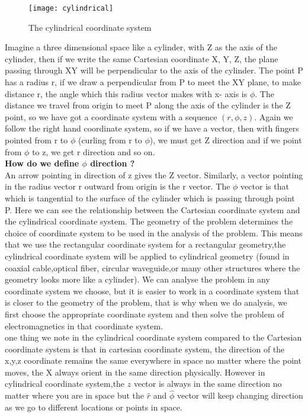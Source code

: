 	\begin{figure}[h]
		\centering
		\texttt{[image: cylindrical]}
		\caption{The cylindrical coordinate system}
	\end{figure} 
     Imagine a three dimensional space like a cylinder, with Z as the axis of the cylinder, then if we write the same Cartesian coordinate X, Y, Z, the plane passing through XY will be perpendicular to the axis of the cylinder. The point P has a radius r, if we draw a perpendicular from P to meet the XY plane, to make distance r, the angle which this radius vector makes with x- axis is $\phi$. The distance we travel from origin to meet P along the axis of the cylinder is the Z point, so we have got a coordinate system with a sequence $( r, \phi, z)$. Again we follow the right hand coordinate system, so if we have a vector, then with fingers pointed from r to $\phi $ (curling from r to $\phi$), we must get Z direction and if we point from $\phi$ to z, we get r direction and so on.\\
	 \textbf{ How do we define $\phi$ direction ?}\\ An arrow pointing in direction of z gives the Z vector. Similarly, a vector pointing in the radius vector r outward from origin is the r vector. The $\phi$ vector is that which is tangential to the surface of the cylinder which is passing through point P. Here we can see the relationship between the Cartesian coordinate system and the cylindrical coordinate system. The geometry of the problem determines the choice of coordinate system to be used in the analysis of the problem. This means that we use the rectangular coordinate system for a rectangular geometry,the cylindrical coordinate system will be applied to cylindrical geometry (found in coaxial cable,optical fiber, circular waveguide,or many other structures  where the geometry looks more like a cylinder).  We can analyse the problem in any coordinate system we choose, but it is easier to work in a coordinate system  that is closer to the geometry of the problem, that is why when we do analysis, we first choose the appropriate coordinate system and then solve the problem of electromagnetics in that coordinate system.\\
	  one thing we note in the cylindrical coordinate system compared to the Cartesian coordinate system is that in cartesian coordinate system, the direction of the x,y,z coordinate remains the same everywhere in space no matter where the point moves, the X always orient in the same direction physically. However in cylindrical coordinate system,the $\hat{z}$ vector is always in the same direction no matter where you are in space but the $\hat{r}$ and $\hat{\phi}$ vector will keep changing direction as we go to different locations or points in space.
	 

